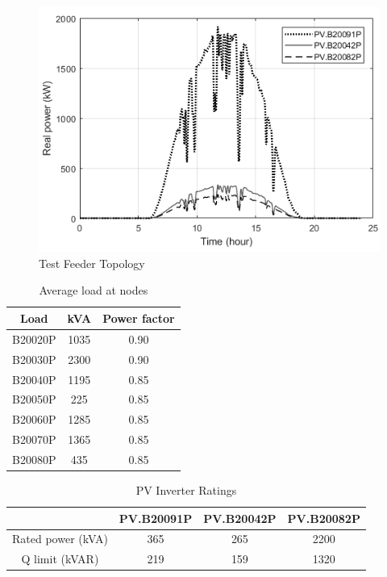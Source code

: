 \begin{figure}[!h]
\centering
\includegraphics[width=\linewidth]{figs/PV_DATA.png}
\caption{Test Feeder Topology}
\label{fig:pv_data}
\end{figure}

\begin{table}[!h]
\caption{Average load at nodes}
\label{tab:load_data}
\centering
\begin{tabular}{|c|c|c|}
\hline
Load & kVA & Power factor \\ \hline
B20020P & 1035 & 0.90 \\ \hline
B20030P & 2300 & 0.90 \\ \hline
B20040P & 1195 & 0.85 \\ \hline
B20050P & 225 & 0.85 \\ \hline
B20060P & 1285 & 0.85 \\ \hline
B20070P & 1365 & 0.85 \\ \hline
B20080P & 435 & 0.85 \\ \hline
\end{tabular}
\end{table}


\begin{table}[!h]
\centering
\caption{PV Inverter Ratings}
\label{tab:Inv_rate}
\begin{tabular}{c|c|c|c|}
\cline{2-4}
 & PV.B20091P & PV.B20042P & PV.B20082P \\ \hline
\multicolumn{1}{|c|}{Rated power (kVA)} & 365 & 265 & 2200 \\ \hline
\multicolumn{1}{|c|}{Q limit (kVAR)} & 219 & 159 & 1320 \\ \hline
\end{tabular}
\end{table}